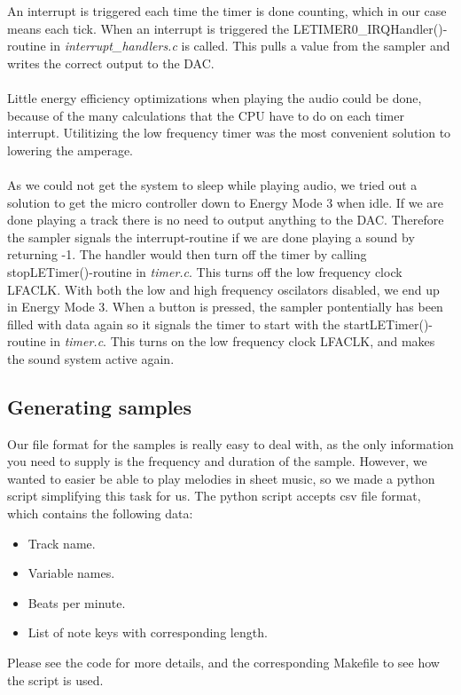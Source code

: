 An interrupt is triggered each time the timer is done counting, which in our case means each tick. When an interrupt is triggered the LETIMER0\_IRQHandler()-routine in \emph{interrupt\_handlers.c} is called. This pulls a value from the sampler and writes the correct output to the DAC. \\
\\
Little energy efficiency optimizations when playing the audio could be done, because of the many calculations that the CPU have to do on each timer interrupt. Utilitizing the low frequency timer was the most convenient solution to lowering the amperage.\\
\\
As we could not get the system to sleep while playing audio, we tried out a solution to get the micro controller down to Energy Mode 3 when idle. If we are done playing a track there is no need to output anything to the DAC. Therefore the sampler signals the interrupt-routine if we are done playing a sound by returning -1. The handler would then turn off the timer by calling stopLETimer()-routine in \emph{timer.c}. This turns off the low frequency clock LFACLK. With both the low and high frequency oscilators disabled, we end up in Energy Mode 3.
When a button is pressed, the sampler pontentially has been filled with data again so it signals the timer to start with the startLETimer()-routine in \emph{timer.c}. This turns on the low frequency clock LFACLK, and makes the sound system active again.

 



\subsection{Generating samples}
Our file format for the samples is really easy to deal with, as the only information you need to supply is the frequency and duration of the sample. However, we wanted to easier be able to play melodies in sheet music, so we made a python script simplifying this task for us. The python script accepts csv file format, which contains the following data:
\begin{itemize}
	\item Track name.
	\item Variable names.
	\item Beats per minute.
	\item List of note keys with corresponding length.
\end{itemize}

Please see the code for more details, and the corresponding Makefile to see how the script is used.

